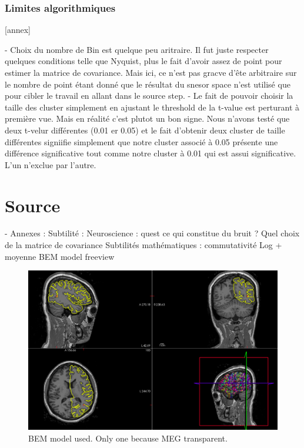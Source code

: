 


\subsection{Limites algorithmiques}
[annex]

- Choix du nombre de Bin est quelque peu aritraire. Il fut juste respecter quelques conditions telle que Nyquist, plus le fait d'avoir assez de point pour estimer la matrice de covariance. Mais ici, ce n'est pas gracve d'ête arbitraire sur le nombre de point étant donné que le résultat du snesor space n'est utilisé que pour cibler le travail en allant dans le source step.
- Le fait de pouvoir choisir la taille des cluster simplement en ajustant le threshold de la t-value est perturant à première vue. Mais en réalité c'est plutot un bon signe. Nous n'avons testé que deux t-velur différentes (0.01 er 0.05) et le fait d'obtenir deux cluster de taille différentes signiifie simplement que notre cluster associé à 0.05 présente une différence significative tout comme notre cluster à 0.01 qui est assui significative. L'un n'exclue par l'autre.


\chapter{Source}

- Annexes : Subtilité :
Neuroscience : quest ce qui constitue du bruit ? Quel choix de la matrice de covariance
Subtilités mathématiques :  commutativité Log + moyenne
BEM model freeview



\begin{figure}[ht]
    \centering
    \includegraphics[width=15cm]{images_report/source/BEM_model_freeview_cropped.png}
    \caption[Segemntentation results visualized on Freeview.]%
    {BEM model used. Only one because MEG transparent.}
    \label{BEM_model_freeview_cropped}
\end{figure}
